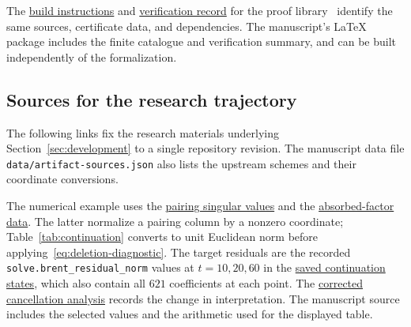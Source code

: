 The
\href{https://github.com/Oxelra-AI/Qiushi-Engine-Matmul-Research/blob/lean-formalization/formalization/README.md}{build instructions}
and
\href{https://github.com/Oxelra-AI/Qiushi-Engine-Matmul-Research/blob/lean-formalization/formalization/verification-results.json}{verification record}
for the proof library~\cite{qiushi-lean} identify the same sources,
certificate data, and dependencies.
The manuscript's LaTeX package includes the finite catalogue and
verification summary, and can be built independently of the
formalization.

\subsection{Sources for the research trajectory}\label{app:trajectory-sources}
The following links fix the research materials underlying
Section~\ref{sec:development} to a single repository revision.
The manuscript data file \nolinkurl{data/artifact-sources.json}
also lists the upstream schemes and their coordinate conversions.

The numerical example uses the
\href{https://github.com/Oxelra-AI/Qiushi-Engine-Matmul-Research/blob/01b4a6baf3788bf3f14af98a653ea22dafa0691c/research/materials/exact_baselines/results/fmm_r23_schemes/puiseux_analysis.json}{pairing singular values}
and the
\href{https://github.com/Oxelra-AI/Qiushi-Engine-Matmul-Research/blob/01b4a6baf3788bf3f14af98a653ea22dafa0691c/research/materials/exact_baselines/results/fmm_r23_schemes/cancellation_analysis.json}{absorbed-factor data}.
The latter normalize a pairing column by a nonzero coordinate;
Table~\ref{tab:continuation} converts to unit Euclidean norm before
applying~\eqref{eq:deletion-diagnostic}. The target residuals are
the recorded \nolinkurl{solve.brent_residual_norm} values at
$t=10,20,60$ in the
\href{https://github.com/Oxelra-AI/Qiushi-Engine-Matmul-Research/blob/01b4a6baf3788bf3f14af98a653ea22dafa0691c/research/materials/exact_baselines/results/fmm_r23_schemes/serendipitous_8d34_continuation_ranked0_further.json}{saved continuation states},
which also contain all $621$ coefficients at each point.
The
\href{https://github.com/Oxelra-AI/Qiushi-Engine-Matmul-Research/blob/01b4a6baf3788bf3f14af98a653ea22dafa0691c/research/materials/deformation_and_incidence/notes/corrected_cancellation.md}{corrected cancellation analysis}
records the change in interpretation. The manuscript source includes
the selected values and the arithmetic used for the displayed table.


